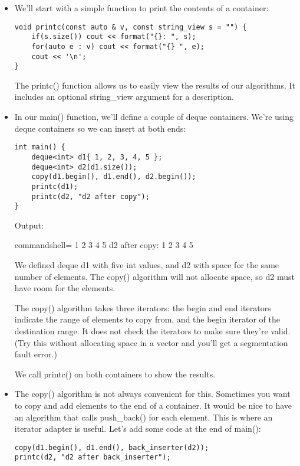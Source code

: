 \begin{itemize}
\item 
We'll start with a simple function to print the contents of a container:

\begin{lstlisting}[style=styleCXX]
void printc(const auto & v, const string_view s = "") {
	if(s.size()) cout << format("{}: ", s);
	for(auto e : v) cout << format("{} ", e);
	cout << '\n';
}
\end{lstlisting}

The printc() function allows us to easily view the results of our algorithms. It includes an optional string\_view argument for a description.

\item 
In our main() function, we'll define a couple of deque containers. We're using deque containers so we can insert at both ends:

\begin{lstlisting}[style=styleCXX]
int main() {
	deque<int> d1{ 1, 2, 3, 4, 5 };
	deque<int> d2(d1.size());
	copy(d1.begin(), d1.end(), d2.begin());
	printc(d1);
	printc(d2, "d2 after copy");
}
\end{lstlisting}

Output:

\begin{tcblisting}{commandshell={}}
1 2 3 4 5
d2 after copy: 1 2 3 4 5
\end{tcblisting}

We defined deque d1 with five int values, and d2 with space for the same number of elements. The copy() algorithm will not allocate space, so d2 must have room for the elements.

The copy() algorithm takes three iterators: the begin and end iterators indicate the range of elements to copy from, and the begin iterator of the destination range. It does not check the iterators to make sure they're valid. (Try this without allocating space in a vector and you'll get a segmentation fault error.) 

We call printc() on both containers to show the results.

\item 
The copy() algorithm is not always convenient for this. Sometimes you want to copy and add elements to the end of a container. It would be nice to have an algorithm that calls push\_back() for each element. This is where an iterator adapter is useful. Let's add some code at the end of main():

\begin{lstlisting}[style=styleCXX]
copy(d1.begin(), d1.end(), back_inserter(d2));
printc(d2, "d2 after back_inserter");
\end{lstlisting}


\end{itemize}
